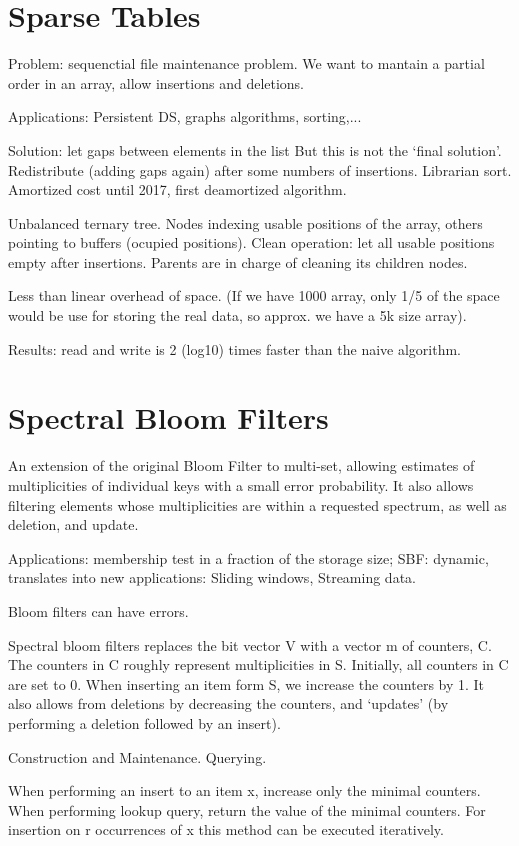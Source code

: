 \documentclass[a4paper, 10pt]{article}
\begin{document}
\section{Sparse Tables}
Problem: sequenctial file maintenance problem. We want to mantain a partial order in an array, allow insertions and deletions.

Applications: Persistent DS, graphs algorithms, sorting,...

Solution: let gaps between elements in the list But this is not the `final solution'. Redistribute (adding gaps again) after some numbers of insertions. Librarian sort. Amortized cost until 2017, first deamortized algorithm.

Unbalanced ternary tree. Nodes indexing usable positions of the array, others pointing to buffers (ocupied positions). Clean operation: let all usable positions empty after insertions. Parents are in charge of cleaning its children nodes.

Less than linear overhead of space. (If we have 1000 array, only 1/5 of the space would be use for storing the real data, so approx. we have a 5k size array).

Results: read and write is 2 (log10) times faster than the naive algorithm.

\section{Spectral Bloom Filters}
An extension of the original Bloom Filter to multi-set, allowing estimates of multiplicities of individual keys with a small error probability. It also allows filtering elements whose multiplicities are within a requested spectrum, as well as deletion, and update.

Applications: membership test in a fraction of the storage size; SBF: dynamic, translates into new applications: Sliding windows, Streaming data.

Bloom filters can have errors.

Spectral bloom filters replaces the bit vector V with a vector m of counters, C. The counters in C roughly represent multiplicities in S. Initially, all counters in C are set to 0. When inserting an item form S, we increase the counters by 1. It also allows from deletions by decreasing the counters, and `updates' (by performing a deletion followed by an insert).

Construction and Maintenance. Querying.

When performing an insert to an item x, increase only the minimal counters. When performing lookup query, return the value of the minimal counters. For insertion on r occurrences of x this method can be executed iteratively.
\end{document}
